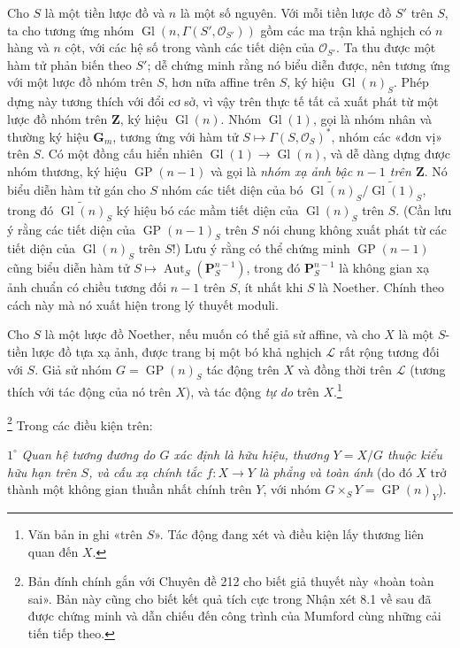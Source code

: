 Cho $S$ là một tiền lược đồ và $n$ là một số nguyên. Với mỗi tiền lược đồ $S'$
trên $S$, ta cho tương ứng nhóm
$\operatorname{Gl}(n,\Gamma(S',\mathcal O_{S'}))$ gồm các ma trận khả nghịch có
$n$ hàng và $n$ cột, với các hệ số trong vành các tiết diện của
$\mathcal O_{S'}$. Ta thu được một hàm tử phản biến theo $S'$; dễ chứng minh
rằng nó biểu diễn được, nên tương ứng với một lược đồ nhóm trên $S$, hơn nữa
affine trên $S$, ký hiệu $\operatorname{Gl}(n)_S$. Phép dựng này tương thích
với đổi cơ sở, vì vậy trên thực tế tất cả xuất phát từ một lược đồ nhóm trên
$\mathbf Z$, ký hiệu $\operatorname{Gl}(n)$. Nhóm $\operatorname{Gl}(1)$, gọi
là nhóm nhân và thường ký hiệu $\mathbf G_m$, tương ứng với hàm tử
$S\longmapsto\Gamma(S,\mathcal O_S)^*$, nhóm các «đơn vị» trên $S$. Có một
đồng cấu hiển nhiên $\operatorname{Gl}(1)\to\operatorname{Gl}(n)$, và dễ dàng
dựng được nhóm thương, ký hiệu $\operatorname{GP}(n-1)$ và gọi là
\emph{nhóm xạ ảnh bậc $n-1$ trên $\mathbf Z$}. Nó biểu diễn hàm tử gán cho
$S$ nhóm các tiết diện của bó
$\widetilde{\operatorname{Gl}(n)}_S/
\widetilde{\operatorname{Gl}(1)}_S$, trong đó
$\widetilde{\operatorname{Gl}(n)}_S$ ký hiệu bó các mầm tiết diện của
$\operatorname{Gl}(n)_S$ trên $S$. (Cần lưu ý rằng các tiết diện của
$\operatorname{GP}(n-1)_S$ trên $S$ nói chung không xuất phát từ các tiết diện
của $\operatorname{Gl}(n)_S$ trên $S$!) Lưu ý rằng có thể chứng minh
$\operatorname{GP}(n-1)$ cũng biểu diễn hàm tử
$S\longmapsto\operatorname{Aut}_S(\mathbf P_S^{n-1})$, trong đó
$\mathbf P_S^{n-1}$ là không gian xạ ảnh chuẩn có chiều tương đối $n-1$ trên
$S$, ít nhất khi $S$ là Noether. Chính theo cách này mà nó xuất hiện trong lý
thuyết moduli.

Cho $S$ là một lược đồ Noether, nếu muốn có thể giả sử affine, và cho $X$ là
một $S$-tiền lược đồ tựa xạ ảnh, được trang bị một bó khả nghịch $\mathcal L$
rất rộng tương đối với $S$. Giả sử nhóm $G=\operatorname{GP}(n)_S$ tác động
trên $X$ và đồng thời trên $\mathcal L$ (tương thích với tác động của nó trên
$X$), và tác động \emph{tự do} trên $X$.\footnote{Văn bản in ghi «trên $S$».
Tác động đang xét và điều kiện lấy thương liên quan đến $X$.}

\footnote{Bản đính chính gắn với Chuyên đề 212 cho
biết giả thuyết này «hoàn toàn sai». Bản này cũng cho biết kết quả tích cực
trong Nhận xét 8.1 về sau đã được chứng minh và dẫn chiếu đến công trình của Mumford
cùng những cải tiến tiếp theo.} Trong các điều kiện trên:

\smallskip
\noindent $1^\circ$ \emph{Quan hệ tương đương do $G$ xác định là hữu hiệu,
thương $Y=X/G$ thuộc kiểu hữu hạn trên $S$, và cấu xạ chính tắc $f:X\to Y$ là
phẳng và toàn ánh} (do đó $X$ trở thành một không gian thuần nhất chính trên
$Y$, với nhóm $G\times_S Y=\operatorname{GP}(n)_Y$).

